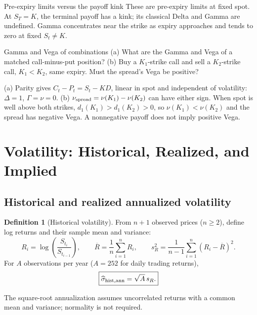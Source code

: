 \documentclass[10pt]{article}
\newcommand{\1}{\mathbf 1}
\theoremstyle{definition}
\newtheorem{definition}{Definition}[section]
\begin{document}
\begin{warningbox}{Pre-expiry limits versus the payoff kink}
These are pre-expiry limits at fixed spot. At \(S_T=K\), the terminal payoff
has a kink; its classical Delta and Gamma are undefined. Gamma concentrates
near the strike as expiry approaches and tends to zero at fixed \(S_t\ne K\).
\end{warningbox}

\begin{studentexercise}{Gamma and Vega of combinations}
(a) What are the Gamma and Vega of a matched call-minus-put position?
(b) Buy a \(K_1\)-strike call and sell a \(K_2\)-strike call, \(K_1<K_2\),
same expiry. Must the spread's Vega be positive?
\end{studentexercise}
\begin{shortsolution}
(a) Parity gives \(C_t-P_t=S_t-KD\), linear in spot and independent of
volatility: \(\Delta=1\), \(\Gamma=\nu=0\).
(b) \(\nu_{\rm spread}=\nu(K_1)-\nu(K_2)\) can have either sign. When spot is
well above both strikes, \(d_1(K_1)>d_1(K_2)>0\), so \(\nu(K_1)<\nu(K_2)\)
and the spread has negative Vega. A nonnegative payoff does not imply
positive Vega.
\end{shortsolution}

\section{Volatility: Historical, Realized, and Implied}

\subsection{Historical and realized annualized volatility}

\begin{definition}[Historical volatility]
From \(n+1\) observed prices (\(n\ge2\)), define log returns and their sample
mean and variance:
\[
R_i=\log\!\left(\frac{S_{t_i}}{S_{t_{i-1}}}\right),\qquad
\overline R=\frac1n\sum_{i=1}^nR_i,\qquad
s_R^2=\frac1{n-1}\sum_{i=1}^n(R_i-\overline R)^2.
\]
For \(A\) observations per year (\(A=252\) for daily trading returns),
\[
\boxed{\widehat\sigma_{\rm hist,ann}=\sqrt A\,s_R.}
\]
\end{definition}

The square-root annualization assumes uncorrelated returns with a common mean
and variance; normality is not required.
\end{document}
